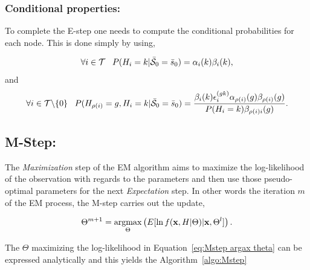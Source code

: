 \documentclass[a4paper,11pt]{report}
\begin{document}
			\subsubsection{Conditional properties:}
				\label{subsubsec:SCHMT/Learning/E/Cond}
				
				To complete the E-step one needs to compute the conditional probabilities for each node. This is done simply by using,
				
				\begin{equation}
				  \forall i \in \mathcal{T} \;\;\; P(H_{i}=k | \bar{\mathcal{S}}_{0}=\bar{s}_{0}) = \alpha_{i}(k) \beta_{i}(k),
				  \label{eq:Estep cond proba node}
				\end{equation}
				and
				\begin{equation}
				  \forall i \in \mathcal{T}\backslash\{0\} 
				  \;\;\; P(H_{\rho(i)}=g, H_{i}=k | \bar{\mathcal{S}}_{0}=\bar{s}_{0}) = \frac{\beta_{i}(k)\epsilon_{i}^{(gk)}\alpha_{\rho(i)}(g)\beta_{\rho(i)}(g)}{P(H_{i}=k) \beta_{\rho(i)i}(g)}.
				  \label{eq:E-step cond proba and parent}
				\end{equation}
		
		\subsection{M-Step:}
			\label{subsec:SCHMT/Learning/M}
			
			The \textit{Maximization} step of the EM algorithm aims to maximize the log-likelihood of the observation with regards to the parameters and then use those pseudo-optimal parameters for the next \textit{Expectation} step. In other words the iteration $m$ of the EM process, the M-step carries out the update,
			
			\begin{equation}
				\Theta^{m+1} = \mathop{\rm argmax}_{\Theta} \left(E[\ln f({\bf x},H|\Theta)|{\bf x},\Theta^{l}] \right).
				\label{eq:Mstep argax theta}
			\end{equation}
			
			The $\Theta$ maximizing the log-likelihood in Equation~\ref{eq:Mstep argax theta} can be expressed analytically and this yields the Algorithm~\ref{algo:Mstep}
			
\end{document}
